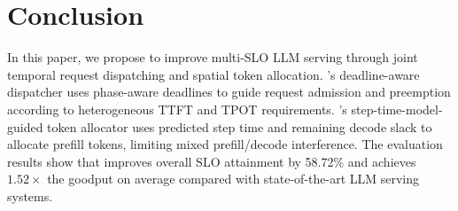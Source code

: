 \section{Conclusion}
\label{sec:conclusion}

In this paper, we propose \tango{} to improve multi-SLO LLM serving through joint temporal request dispatching and spatial token allocation.
\tango's deadline-aware dispatcher uses phase-aware deadlines to guide request admission and preemption according to heterogeneous TTFT and TPOT requirements.
\tango's step-time-model-guided token allocator uses predicted step time and remaining decode slack to allocate prefill tokens, limiting mixed prefill/decode interference.
The evaluation results show that \tango{} improves overall SLO attainment by 58.72\% and achieves $1.52\times$ the goodput on average compared with state-of-the-art LLM serving systems.
